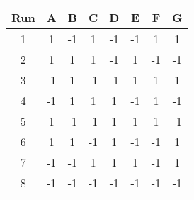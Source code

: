 \begin{table}[]
    \centering
    \begin{tabular}{@{\kern\tabcolsep}cccccccc@{\kern\tabcolsep}}
        \toprule
        Run & A & B & C & D & E & F & G \\ \midrule
        \cellcolor{gray!18}1 & \cellcolor{green!25}1 & \cellcolor{red!25}-1 & \cellcolor{green!25}1 & \cellcolor{red!25}-1 & \cellcolor{red!25}-1 & \cellcolor{green!25}1 & \cellcolor{green!25}1 \\
        \cellcolor{gray!18}2 & \cellcolor{green!25}1 & \cellcolor{green!25}1 & \cellcolor{green!25}1 & \cellcolor{red!25}-1 & \cellcolor{green!25}1 & \cellcolor{red!25}-1 & \cellcolor{red!25}-1 \\
        \cellcolor{gray!18}3 & \cellcolor{red!25}-1 & \cellcolor{green!25}1 & \cellcolor{red!25}-1 & \cellcolor{red!25}-1 & \cellcolor{green!25}1 & \cellcolor{green!25}1 & \cellcolor{green!25}1 \\
        \cellcolor{gray!18}4 & \cellcolor{red!25}-1 & \cellcolor{green!25}1 & \cellcolor{green!25}1 & \cellcolor{green!25}1 & \cellcolor{red!25}-1 & \cellcolor{green!25}1 & \cellcolor{red!25}-1 \\
        \cellcolor{gray!18}5 & \cellcolor{green!25}1 & \cellcolor{red!25}-1 & \cellcolor{red!25}-1 & \cellcolor{green!25}1 & \cellcolor{green!25}1 & \cellcolor{green!25}1 & \cellcolor{red!25}-1 \\
        \cellcolor{gray!18}6 & \cellcolor{green!25}1 & \cellcolor{green!25}1 & \cellcolor{red!25}-1 & \cellcolor{green!25}1 & \cellcolor{red!25}-1 & \cellcolor{red!25}-1 & \cellcolor{green!25}1 \\
        \cellcolor{gray!18}7 & \cellcolor{red!25}-1 & \cellcolor{red!25}-1 & \cellcolor{green!25}1 & \cellcolor{green!25}1 & \cellcolor{green!25}1 & \cellcolor{red!25}-1 & \cellcolor{green!25}1 \\
        \cellcolor{gray!18}8 & \cellcolor{red!25}-1 & \cellcolor{red!25}-1 & \cellcolor{red!25}-1 & \cellcolor{red!25}-1 & \cellcolor{red!25}-1 & \cellcolor{red!25}-1 & \cellcolor{red!25}-1  \\ \bottomrule
    \end{tabular}
\end{table}
